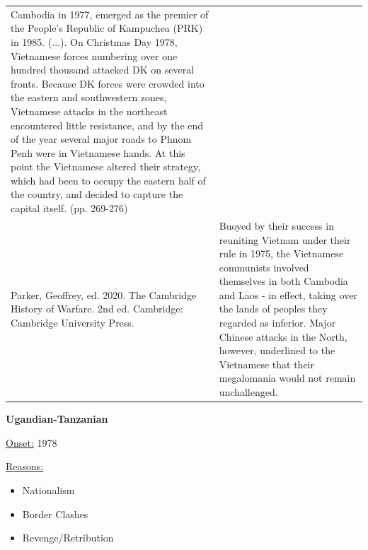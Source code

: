 {\begin{longtable}{p{}p{}}
Cambodia in 1977, emerged as the premier of the People's Republic of Kampuchea (PRK) in 1985. (...). On Christmas Day 1978, Vietnamese forces numbering over one hundred thousand attacked DK on several fronts. Because DK forces were crowded into the eastern and southwestern zones, Vietnamese attacks in the northeast encountered little resistance, and by the end of the year several major roads to Phnom Penh were in Vietnamese hands. At this point the Vietnamese altered their strategy, which had been to occupy the eastern half of the country, and decided to capture the capital itself. (pp. 269-276)
\\
Parker, Geoffrey, ed. 2020. The Cambridge History of Warfare. 2nd ed. Cambridge: Cambridge University Press. & Buoyed by their success in reuniting Vietnam under their rule in 1975, the Vietnamese communists involved themselves in both Cambodia and Laos - in effect, taking over the lands of peoples they regarded as inferior. Major Chinese attacks in the North, however, underlined to the Vietnamese that their megalomania would not remain unchallenged.
\\
\end{longtable}}
\clearpage
         \textbf{Ugandian-Tanzanian} 

          \underline{Onset:} 1978         

\underline{Reasons:}
\begin{itemize}
\item Nationalism
\item Border Clashes
\item Revenge/Retribution
\end{itemize}

